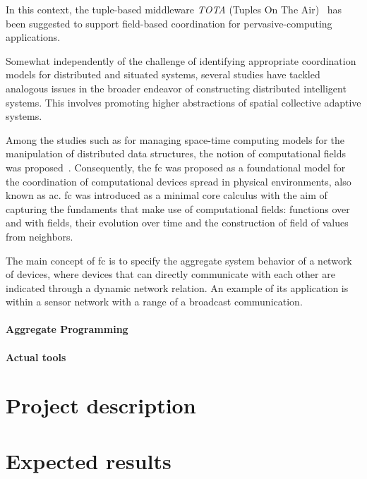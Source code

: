 \documentclass[12pt, a4paper]{article}
\begin{document}
In this context, the tuple-based middleware \textit{TOTA} (Tuples On The Air)~\cite{tota} has been suggested
to support field-based coordination for pervasive-computing applications.

Somewhat independently of the challenge of identifying appropriate coordination models for distributed and situated systems,
several studies have tackled analogous issues in the broader endeavor of constructing distributed intelligent systems.
%
This involves promoting higher abstractions of spatial collective adaptive systems.

Among the studies such as for managing space-time computing models for the manipulation of distributed data structures,
the notion of computational fields was proposed~\cite{JLAMP2019}.
%
Consequently, the \ac{fc} was proposed as a foundational model for the coordination of computational devices spread in physical environments,
also known as \ac{ac}.
%
\ac{fc} was introduced as a minimal core calculus with the aim of capturing the fundaments that make use of computational fields:
functions over and with fields, their evolution over time and the construction of field of values from neighbors.

The main concept of \ac{fc} is to specify the aggregate system behavior of a network of devices,
where devices that can directly communicate with each other are indicated through a dynamic network relation.
%
An example of its application is within a sensor network with a range of a broadcast communication.


\paragraph{Aggregate Programming}

\paragraph{Actual tools}


\section{Project description}\label{sec:project-description}


\section{Expected results}\label{sec:expected-results}
\end{document}
